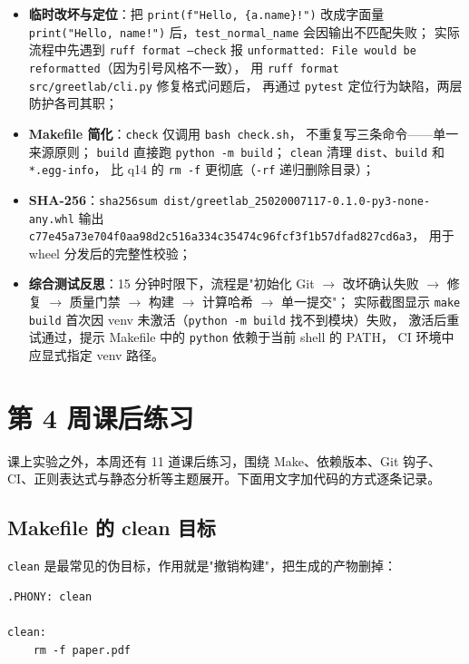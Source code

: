 \documentclass[a4paper,11pt]{ctexart}
\begin{document}
\begin{itemize}
  \item \textbf{临时改坏与定位}：把 \texttt{print(f"Hello, \{a.name\}!")} 改成字面量
        \texttt{print("Hello, name!")} 后，\texttt{test\_normal\_name} 会因输出不匹配失败；
        实际流程中先遇到 \texttt{ruff format --check} 报
        \texttt{unformatted: File would be reformatted}（因为引号风格不一致），
        用 \texttt{ruff format src/greetlab/cli.py} 修复格式问题后，
        再通过 \texttt{pytest} 定位行为缺陷，两层防护各司其职；
  \item \textbf{Makefile 简化}：\texttt{check} 仅调用 \texttt{bash check.sh}，
        不重复写三条命令——单一来源原则；
        \texttt{build} 直接跑 \texttt{python -m build}；
        \texttt{clean} 清理 \texttt{dist}、\texttt{build} 和 \texttt{*.egg-info}，
        比 q14 的 \texttt{rm -f} 更彻底（\texttt{-rf} 递归删除目录）；
  \item \textbf{SHA-256}：\texttt{sha256sum dist/greetlab\_25020007117-0.1.0-py3-none-any.whl}
        输出 \texttt{c77e45a73e704f0aa98d2c516a334c35474c96fcf3f1b57dfad827cd6a3}，
        用于 wheel 分发后的完整性校验；
  \item \textbf{综合测试反思}：15 分钟时限下，流程是"初始化 Git $\to$ 改坏确认失败 $\to$ 修复 $\to$ 质量门禁 $\to$ 构建 $\to$ 计算哈希 $\to$ 单一提交"；
        实际截图显示 \texttt{make build} 首次因 venv 未激活（\texttt{python -m build} 找不到模块）失败，
        激活后重试通过，提示 Makefile 中的 \texttt{python} 依赖于当前 shell 的 PATH，
        CI 环境中应显式指定 venv 路径。
\end{itemize}

\section{第 4 周课后练习}

课上实验之外，本周还有 11 道课后练习，围绕 Make、依赖版本、Git 钩子、CI、正则表达式与静态分析等主题展开。下面用文字加代码的方式逐条记录。

\subsection{Makefile 的 clean 目标}

\texttt{clean} 是最常见的伪目标，作用就是"撤销构建"，把生成的产物删掉：

\begin{lstlisting}[numbers=none]
.PHONY: clean

clean:
	rm -f paper.pdf
\end{lstlisting}
\end{document}
